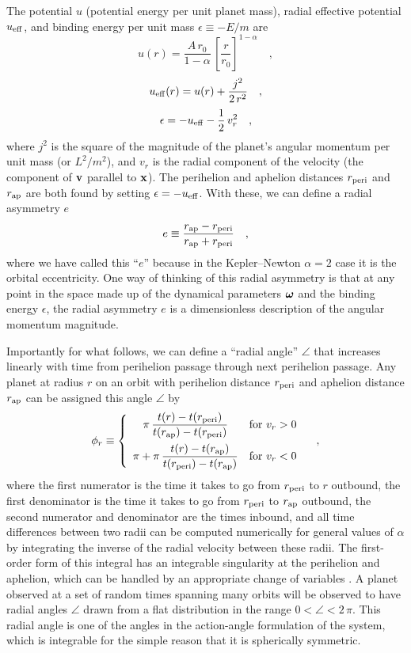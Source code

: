 The potential $u$ (potential energy per unit planet mass), radial
effective potential $u_{\mathrm{eff}}$, and binding
energy per unit mass $\epsilon\equiv -E/m$ are
\begin{equation}
u(r) = \frac{A\,r_0}{1-\alpha}\,\left[\frac{r}{r_0}\right]^{1-\alpha} \quad,
\end{equation}
\begin{equation}
u_{\mathrm{eff}}(r) = u(r) + \frac{j^2}{2\,r^2} \quad,
\end{equation}
\begin{equation}
\epsilon = - u_{\mathrm{eff}} - \frac{1}{2}\,v_r^2 \quad,
\end{equation}
where $j^2$ is the square of the magnitude of the planet's angular
momentum per unit mass (or $L^2/m^2$), and $v_r$ is the radial
component of the velocity (the component of $\boldsymbol{\mathbf{v}}$ parallel to
$\boldsymbol{\mathbf{x}}$).  The perihelion and aphelion distances $r_{\mathrm{peri}}$ and
$r_{\mathrm{ap}}$ are both found by setting $\epsilon=-u_{\mathrm{eff}}$.  With these, we
can define a radial asymmetry $e$
\begin{equation}
e \equiv \frac{r_{\mathrm{ap}} - r_{\mathrm{peri}}}{r_{\mathrm{ap}} + r_{\mathrm{peri}}} \quad,
\end{equation}
where we have called this ``$e$'' because in the Kepler--Newton
$\alpha=2$ case it is the orbital eccentricity.  One way of thinking of
this radial asymmetry is that at any point in the space made up of the
dynamical parameters $\boldsymbol{{\omega}}$ and the binding energy $\epsilon$,
the radial asymmetry $e$ is a dimensionless description of the
angular momentum magnitude.

Importantly for what follows, we can define a ``radial angle''
$\angle$ that increases linearly with time from perihelion passage
through next perihelion passage.  Any planet at radius $r$ on an orbit
with perihelion distance $r_{\mathrm{peri}}$ and aphelion distance $r_{\mathrm{ap}}$ can be
assigned this angle $\angle$ by
\begin{equation}
\phi_r \equiv \left\{\begin{array}{cl}\displaystyle
  \pi\,\frac{t(r)-t(r_{\mathrm{peri}})}{t(r_{\mathrm{ap}})-t(r_{\mathrm{peri}})} & \mbox{for $v_r > 0$}
  \\[2.5ex] \displaystyle
  \pi+\pi\,\frac{t(r)-t(r_{\mathrm{ap}})}{t(r_{\mathrm{peri}})-t(r_{\mathrm{ap}})} & \mbox{for $v_r < 0$}
\end{array}\right. \quad,
\end{equation}
where the first numerator is the time it takes to go from $r_{\mathrm{peri}}$ to
$r$ outbound, the first denominator is the time it takes to go from
$r_{\mathrm{peri}}$ to $r_{\mathrm{ap}}$ outbound, the second numerator and denominator are
the times inbound, and all time differences between two radii can be
computed numerically for general values of $\alpha$ by integrating the
inverse of the radial velocity between these radii. The first-order
form of this integral has an integrable singularity at the perihelion
and aphelion, which can be handled by an appropriate change of
variables \citep[\eg, ][]{Press07a}. A planet observed at a set of
random times spanning many orbits will be observed to have radial
angles $\angle$ drawn from a flat distribution in the range
$0<\angle<2\,\pi$.  This radial angle is one of the angles in the
action-angle formulation of the system, which is integrable for the
simple reason that it is spherically symmetric.

